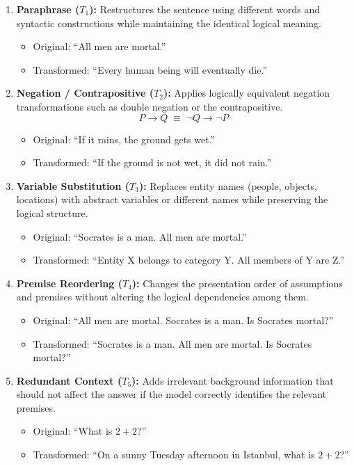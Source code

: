 \begin{enumerate}
    \item \textbf{Paraphrase ($T_1$):} Restructures the sentence using different words and syntactic constructions while maintaining the identical logical meaning.
    \begin{itemize}
        \item Original: ``All men are mortal.''
        \item Transformed: ``Every human being will eventually die.''
    \end{itemize}

    \item \textbf{Negation / Contrapositive ($T_2$):} Applies logically equivalent negation transformations such as double negation or the contrapositive.
    \begin{equation}
        P \rightarrow Q \;\equiv\; \neg Q \rightarrow \neg P
    \end{equation}
    \begin{itemize}
        \item Original: ``If it rains, the ground gets wet.''
        \item Transformed: ``If the ground is not wet, it did not rain.''
    \end{itemize}

    \item \textbf{Variable Substitution ($T_3$):} Replaces entity names (people, objects, locations) with abstract variables or different names while preserving the logical structure.
    \begin{itemize}
        \item Original: ``Socrates is a man. All men are mortal.''
        \item Transformed: ``Entity X belongs to category Y. All members of Y are Z.''
    \end{itemize}

    \item \textbf{Premise Reordering ($T_4$):} Changes the presentation order of assumptions and premises without altering the logical dependencies among them.
    \begin{itemize}
        \item Original: ``All men are mortal. Socrates is a man. Is Socrates mortal?''
        \item Transformed: ``Socrates is a man. All men are mortal. Is Socrates mortal?''
    \end{itemize}

    \item \textbf{Redundant Context ($T_5$):} Adds irrelevant background information that should not affect the answer if the model correctly identifies the relevant premises.
    \begin{itemize}
        \item Original: ``What is $2 + 2$?''
        \item Transformed: ``On a sunny Tuesday afternoon in Istanbul, what is $2 + 2$?''
    \end{itemize}
\end{enumerate}

